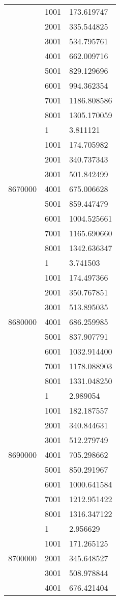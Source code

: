 \begin{table}[htb!]
\begin{tabular}{lll}
 & 1001 & 173.619747 \\
 & 2001 & 335.544825 \\
 & 3001 & 534.795761 \\
 & 4001 & 662.009716 \\
 & 5001 & 829.129696 \\
 & 6001 & 994.362354 \\
 & 7001 & 1186.808586 \\
 & 8001 & 1305.170059 \\
\multirow[c]{9}{*}{8670000} & 1 & 3.811121 \\
 & 1001 & 174.705982 \\
 & 2001 & 340.737343 \\
 & 3001 & 501.842499 \\
 & 4001 & 675.006628 \\
 & 5001 & 859.447479 \\
 & 6001 & 1004.525661 \\
 & 7001 & 1165.690660 \\
 & 8001 & 1342.636347 \\
\multirow[c]{9}{*}{8680000} & 1 & 3.741503 \\
 & 1001 & 174.497366 \\
 & 2001 & 350.767851 \\
 & 3001 & 513.895035 \\
 & 4001 & 686.259985 \\
 & 5001 & 837.907791 \\
 & 6001 & 1032.914400 \\
 & 7001 & 1178.088903 \\
 & 8001 & 1331.048250 \\
\multirow[c]{9}{*}{8690000} & 1 & 2.989054 \\
 & 1001 & 182.187557 \\
 & 2001 & 340.844631 \\
 & 3001 & 512.279749 \\
 & 4001 & 705.298662 \\
 & 5001 & 850.291967 \\
 & 6001 & 1000.641584 \\
 & 7001 & 1212.951422 \\
 & 8001 & 1316.347122 \\
\multirow[c]{9}{*}{8700000} & 1 & 2.956629 \\
 & 1001 & 171.265125 \\
 & 2001 & 345.648527 \\
 & 3001 & 508.978844 \\
 & 4001 & 676.421404 \\

\end{tabular}
\end{table}

